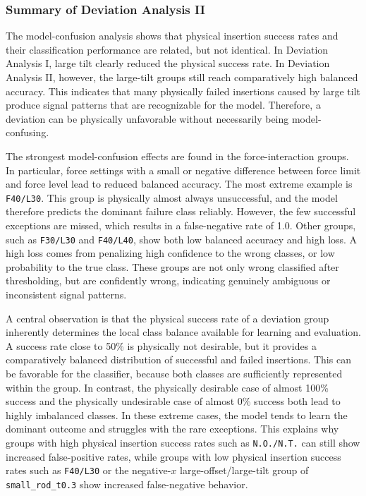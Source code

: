 \newpage
\subsubsection{Summary of Deviation Analysis II}
\label{subsubsec:da2_summary}

The model-confusion analysis shows that physical insertion success rates and their classification performance are related, but not identical. In Deviation Analysis I, large tilt clearly reduced the physical success rate. In Deviation Analysis II, however, the large-tilt groups still reach comparatively high balanced accuracy. This indicates that many physically failed insertions caused by large tilt produce signal patterns that are recognizable for the model. Therefore, a deviation can be physically unfavorable without necessarily being model-confusing.

The strongest model-confusion effects are found in the force-interaction groups. In particular, force settings with a small or negative difference between force limit and force level lead to reduced balanced accuracy. The most extreme example is \texttt{F40/L30}. This group is physically almost always unsuccessful, and the model therefore predicts the dominant failure class reliably. However, the few successful exceptions are missed, which results in a false-negative rate of 1.0. Other groups, such as \texttt{F30/L30} and \texttt{F40/L40}, show both low balanced accuracy and high loss. A high loss comes from penalizing high confidence to the wrong classes, or low probability to the true class. These groups are not only wrong classified after thresholding, but are confidently wrong, indicating genuinely ambiguous or inconsistent signal patterns.

A central observation is that the physical success rate of a deviation group inherently determines the local class balance available for learning and evaluation. A success rate close to 50\% is physically not desirable, but it provides a comparatively balanced distribution of successful and failed insertions. This can be favorable for the classifier, because both classes are sufficiently represented within the group. In contrast, the physically desirable case of almost 100\% success and the physically undesirable case of almost 0\% success both lead to highly imbalanced classes. In these extreme cases, the model tends to learn the dominant outcome and struggles with the rare exceptions. This explains why groups with high physical insertion success rates such as \texttt{N.O./N.T.} can still show increased false-positive rates, while groups with low physical insertion success rates such as \texttt{F40/L30} or the negative-$x$ large-offset/large-tilt group of \texttt{small\_rod\_t0.3} show increased false-negative behavior.

